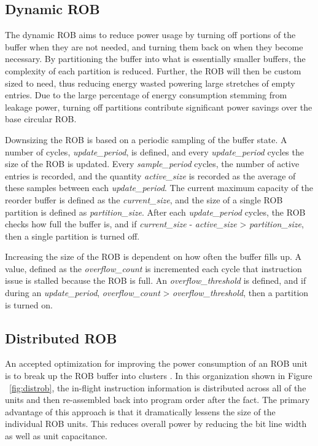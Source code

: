 \subsection{Dynamic ROB}

The dynamic ROB aims to reduce power usage by turning off portions of the buffer when they are not needed, and turning them back on when they become necessary. By partitioning the buffer into what is essentially smaller buffers, the complexity of each partition is reduced. Further, the ROB will then be custom sized to need, thus reducing energy wasted powering large stretches of empty entries. Due to the large percentage of energy consumption stemming from leakage power, turning off partitions contribute significant power savings over the base circular ROB.

Downsizing the ROB is based on a periodic sampling of the buffer state. A number of cycles, {\it update\_period}, is defined, and every {\it update\_period} cycles the size of the ROB is updated. Every {\it sample\_period} cycles, the number of active entries is recorded, and the quantity {\it active\_size} is recorded as the average of these samples between each {\it update\_period}. The current maximum capacity of the reorder buffer is defined as the {\it current\_size}, and the size of a single ROB partition is defined as {\it partition\_size}. After each {\it update\_period} cycles, the ROB checks how full the buffer is, and if {\it current\_size} - {\it active\_size} > {\it partition\_size}, then a single partition is turned off.

Increasing the size of the ROB is dependent on how often the buffer fills up. A value, defined as the {\it overflow\_count} is incremented each cycle that instruction issue is stalled because the ROB is full. An {\it overflow\_threshold} is defined, and if during an {\it update\_period}, {\it overflow\_count} > {\it overflow\_threshold}, then a partition is turned on.

\subsection{Distributed ROB}
An accepted optimization for improving the power consumption of an ROB unit 
is to break up the ROB buffer into clusters \cite{rabaey}.  In this organization shown in Figure ~\ref{fig:distrob}, 
the in-flight 
instruction information is distributed across all of the units and then re-assembled 
back into program order after the fact.  The primary advantage of this approach 
is that it dramatically lessens the size of the individual ROB units.  This reduces overall
power by reducing the bit line width as well as unit capacitance.

